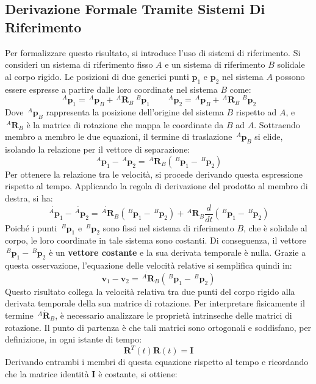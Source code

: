 \documentclass[11pt, a4paper]{report}
\begin{document}
\newpage
\subsection{Derivazione Formale Tramite Sistemi Di Riferimento}
Per formalizzare questo risultato, si introduce l'uso di sistemi di riferimento. Si consideri un sistema di riferimento fisso \(A\) e un sistema di riferimento \(B\) solidale al corpo rigido. Le posizioni di due generici punti \(\bm{p}_{1}\) e \(\bm{p}_{2}\) nel sistema \(A\) possono essere espresse a partire dalle loro coordinate nel sistema \(B\) come:
\[
    \,^{A}\bm{p}_1 = \,^{A}\bm{p}_B + \,^{A}\bm{R}_B \; ^{B}\bm{p}_1 \qquad \,^{A}\bm{p}_2 = \,^{A}\bm{p}_B + \,^{A}\bm{R}_B \; ^{B}{\bm{p}}_2
\]
Dove \(\,^{A}\bm{p}_B\) rappresenta la posizione dell'origine del sistema \(B\) rispetto ad \(A\), e \(\,^{A}\bm{R}_B\) è la matrice di rotazione che mappa le coordinate da \(B\) ad \(A\). Sottraendo membro a membro le due equazioni, il termine di traslazione \(\,^{A}\bm{p}_B\) si elide, isolando la relazione per il vettore di separazione:
\[
    \,^{A}\bm{p}_1 - \,^{A}\bm{p}_2 = \,^{A}\bm{R}_B \left(\,^{B}\bm{p}_1 - \,^{B}{\bm{p}}_2 \right)
\]
Per ottenere la relazione tra le velocità, si procede derivando questa espressione rispetto al tempo. Applicando la regola di derivazione del prodotto al membro di destra, si ha:
\[
    \dot{\,^{A}\bm{p}}_1 - \dot{\,^{A}\bm{p}}_2 = \dot{\,^{A}\bm{R}}_B \left( \,^{B}{\bm{p}}_1 - \,^{B}{\bm{p}}_2 \right) + \,^{A}\bm{R}_B \frac{d}{dt}\left( \,^{B}{\bm{p}}_1 - \,^{B}{\bm{p}}_2 \right)
\]
Poiché i punti \(\,^{B}{\bm{p}}_1\) e \(\,^{B}{\bm{p}}_2\) sono fissi nel sistema di riferimento \(B\), che è solidale al corpo, le loro coordinate in tale sistema sono costanti. Di conseguenza, il vettore \(\,^{B}{\bm{p}}_1 - \,^{B}{\bm{p}}_2\) è un \textbf{vettore costante} e la sua derivata temporale è nulla. Grazie a questa osservazione, l'equazione delle velocità relative si semplifica quindi in:
\[
    \bm{v}_1 - \bm{v}_2 = \dot{\,^{A}\bm{R}}_B \left( \,^{B}{\bm{p}}_1 - \,^{B}{\bm{p}}_2 \right)
\]
Questo risultato collega la velocità relativa tra due punti del corpo rigido alla derivata temporale della sua matrice di rotazione. Per interpretare fisicamente il termine \(\,^{A}\dot{\bm{R}}_B\), è necessario analizzare le proprietà intrinseche delle matrici di rotazione. Il punto di partenza è che tali matrici sono ortogonali e soddisfano, per definizione, in ogni istante di tempo:
\[
    \bm{R}^T(t) \bm{R}(t) = \bm{I}
\]
Derivando entrambi i membri di questa equazione rispetto al tempo e ricordando che la matrice identità \(\bm{I}\) è costante, si ottiene:
\end{document}
